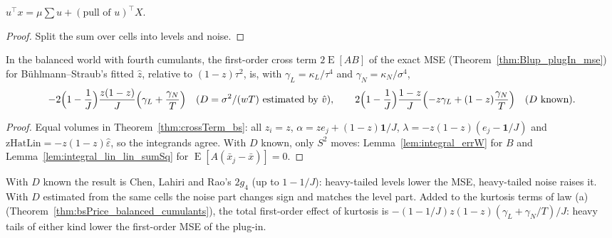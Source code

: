 \begin{lemma}\label{lem:primCells}
  \leanok
  $u^\top x = \mu\sum u + (\text{pull of }u)^\top X$.
\end{lemma}
\begin{proof}
  \leanok
  Split the sum over cells into levels and noise.
\end{proof}

\begin{theorem}\label{thm:crossTerm_balanced_cumulants}
  \leanok
  In the balanced world with fourth cumulants, the first-order cross term $2\operatorname{E}[AB]$ of the
  exact MSE (Theorem~\ref{thm:Blup_plugIn_mse}) for Bühlmann--Straub's fitted $\hat z$, relative to
  $(1 - z)\tau^2$, is, with $\gamma_L = \kappa_L/\tau^4$ and $\gamma_N = \kappa_N/\sigma^4$,
  \[ -2\Bigl(1 - \frac1J\Bigr)\frac{z(1 - z)}J\Bigl(\gamma_L + \frac{\gamma_N}T\Bigr)
     \quad(D = \sigma^2/(wT)\text{ estimated by }\hat v), \qquad
     2\Bigl(1 - \frac1J\Bigr)\frac{1 - z}J\Bigl(-z\gamma_L + (1 - z)\frac{\gamma_N}T\Bigr)
     \quad(D\text{ known}). \]
\end{theorem}
\begin{proof}
  \leanok
  Equal volumes in Theorem~\ref{thm:crossTerm_bs}: all $z_i = z$, $\alpha = ze_j + (1 - z)\mathbf 1/J$,
  $\lambda = -z(1 - z)(e_j - \mathbf 1/J)$ and $\mathrm{zHatLin} = -z(1 - z)\hat\varepsilon$, so the integrands agree.
  With $D$ known, only $S^2$ moves: Lemma~\ref{lem:integral_errW} for $B$ and
  Lemma~\ref{lem:integral_lin_lin_sumSq} for $\operatorname{E}[A(\bar x_j - \bar x)] = 0$.
\end{proof}

\begin{remark}
  With $D$ known the result is Chen, Lahiri and Rao's $2g_4$ (up to $1 - 1/J$): heavy-tailed levels
  lower the MSE, heavy-tailed noise raises it. With $D$ estimated from the same cells the noise part
  changes sign and matches the level part. Added to the kurtosis terms of law (a)
  (Theorem~\ref{thm:bsPrice_balanced_cumulants}), the total first-order effect of kurtosis is
  $-(1 - 1/J)z(1 - z)(\gamma_L + \gamma_N/T)/J$: heavy tails of either kind lower the first-order MSE
  of the plug-in.
\end{remark}


